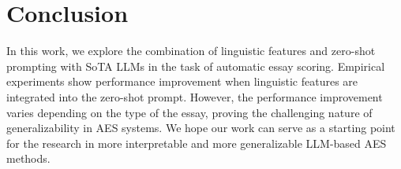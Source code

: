 \section{Conclusion}
\label{conclusion}
In this work, we explore the combination of linguistic features and zero-shot prompting with SoTA LLMs in the task of automatic essay scoring. Empirical experiments show performance improvement when linguistic features are integrated into the zero-shot prompt. However, the performance improvement varies depending on the type of the essay, proving the challenging nature of generalizability in AES systems. We hope our work can serve as a starting point for the research in more interpretable and more generalizable LLM-based AES methods.

